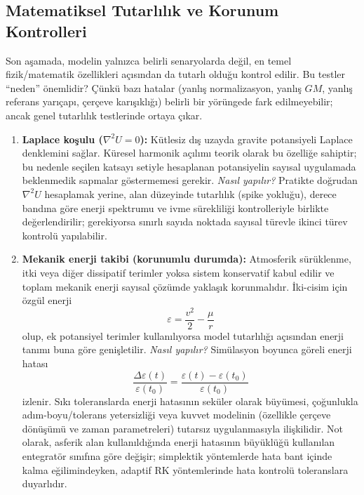 \newpage
\subsection{Matematiksel Tutarlılık ve Korunum Kontrolleri}
Son aşamada, modelin yalnızca belirli senaryolarda değil, en temel fizik/matematik özellikleri açısından da tutarlı olduğu
kontrol edilir. Bu testler ``neden'' önemlidir? Çünkü bazı hatalar (yanlış normalizasyon, yanlış $GM$, yanlış referans yarıçapı,
çerçeve karışıklığı) belirli bir yörüngede fark edilmeyebilir; ancak genel tutarlılık testlerinde ortaya çıkar.

\begin{enumerate}
\item \textbf{Laplace koşulu ($\nabla^2 U = 0$):}
Kütlesiz dış uzayda gravite potansiyeli Laplace denklemini sağlar.
Küresel harmonik açılımı teorik olarak bu özelliğe sahiptir; bu nedenle seçilen katsayı setiyle hesaplanan potansiyelin
sayısal uygulamada beklenmedik sapmalar göstermemesi gerekir.
\emph{Nasıl yapılır?} Pratikte doğrudan $\nabla^2 U$ hesaplamak yerine,
alan düzeyinde tutarlılık (spike yokluğu), derece bandına göre enerji spektrumu ve ivme sürekliliği kontrolleriyle
birlikte değerlendirilir; gerekiyorsa sınırlı sayıda noktada sayısal türevle ikinci türev kontrolü yapılabilir.

\item \textbf{Mekanik enerji takibi (korunumlu durumda):}
Atmosferik sürüklenme, itki veya diğer dissipatif terimler yoksa sistem konservatif kabul edilir ve toplam mekanik enerji
sayısal çözümde yaklaşık korunmalıdır. İki-cisim için özgül enerji
\[
\varepsilon=\frac{v^2}{2}-\frac{\mu}{r}
\]
olup, ek potansiyel terimler kullanılıyorsa model tutarlılığı açısından enerji tanımı buna göre genişletilir.
\emph{Nasıl yapılır?} Simülasyon boyunca göreli enerji hatası
\begin{equation}
\frac{\Delta \varepsilon(t)}{\varepsilon(t_0)}
= \frac{\varepsilon(t)-\varepsilon(t_0)}{\varepsilon(t_0)}
\end{equation}
izlenir. Sıkı toleranslarda enerji hatasının seküler olarak büyümesi, çoğunlukla adım-boyu/tolerans yetersizliği veya
kuvvet modelinin (özellikle çerçeve dönüşümü ve zaman parametreleri) tutarsız uygulanmasıyla ilişkilidir.
Not olarak, asferik alan kullanıldığında enerji hatasının büyüklüğü kullanılan entegratör sınıfına göre değişir;
simplektik yöntemlerde hata bant içinde kalma eğilimindeyken, adaptif RK yöntemlerinde hata kontrolü toleranslara duyarlıdır.
\end{enumerate}


